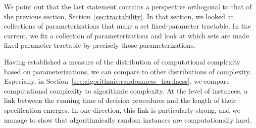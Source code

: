 We point out that the last statement contains a perspective orthogonal to that of the previous section, Section~\ref{sec:tractability}.
In that section, we looked at collections of parameterizations that make a set fixed-parameter tractable.
In the current, we fix a collection of parameterizations and look at which sets are made fixed-parameter tractable by precisely those parameterizations.

Having established a measure of the distribution of computational complexity based on parameterizations, we can compare to other distributions of complexity.
Especially, in Section~\ref{sec:algorithmic:randomness_hardness}, we compare computational complexity to algorithmic complexity.
At the level of instances, a link between the running time of decision procedures and the length of their specification emerges.
In one direction, this link is particularly strong, and we manage to show that algorithmically random instances are computationally hard.


